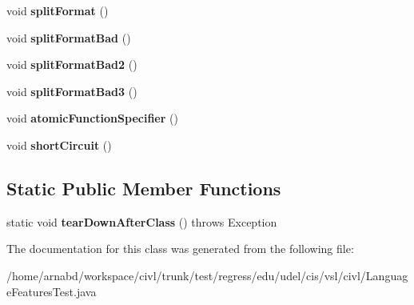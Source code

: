 \begin{DoxyCompactItemize}
\item 
\hypertarget{classedu_1_1udel_1_1cis_1_1vsl_1_1civl_1_1LanguageFeaturesTest_aa39345afbd31c5c1cd903d617ca5005e}{}void {\bfseries split\+Format} ()\label{classedu_1_1udel_1_1cis_1_1vsl_1_1civl_1_1LanguageFeaturesTest_aa39345afbd31c5c1cd903d617ca5005e}

\item 
\hypertarget{classedu_1_1udel_1_1cis_1_1vsl_1_1civl_1_1LanguageFeaturesTest_a744e50558f84c21ccb4fd24a23fc9f99}{}void {\bfseries split\+Format\+Bad} ()\label{classedu_1_1udel_1_1cis_1_1vsl_1_1civl_1_1LanguageFeaturesTest_a744e50558f84c21ccb4fd24a23fc9f99}

\item 
\hypertarget{classedu_1_1udel_1_1cis_1_1vsl_1_1civl_1_1LanguageFeaturesTest_a1360fd9cb99c59a0a1476f0ca05935f2}{}void {\bfseries split\+Format\+Bad2} ()\label{classedu_1_1udel_1_1cis_1_1vsl_1_1civl_1_1LanguageFeaturesTest_a1360fd9cb99c59a0a1476f0ca05935f2}

\item 
\hypertarget{classedu_1_1udel_1_1cis_1_1vsl_1_1civl_1_1LanguageFeaturesTest_a658fa96e541ae86c71da2629e2080bd8}{}void {\bfseries split\+Format\+Bad3} ()\label{classedu_1_1udel_1_1cis_1_1vsl_1_1civl_1_1LanguageFeaturesTest_a658fa96e541ae86c71da2629e2080bd8}

\item 
\hypertarget{classedu_1_1udel_1_1cis_1_1vsl_1_1civl_1_1LanguageFeaturesTest_a0ed54e55c9b241de25d6779ce35185c5}{}void {\bfseries atomic\+Function\+Specifier} ()\label{classedu_1_1udel_1_1cis_1_1vsl_1_1civl_1_1LanguageFeaturesTest_a0ed54e55c9b241de25d6779ce35185c5}

\item 
\hypertarget{classedu_1_1udel_1_1cis_1_1vsl_1_1civl_1_1LanguageFeaturesTest_a38bcb7788c7493ef31c81229ac219a0c}{}void {\bfseries short\+Circuit} ()\label{classedu_1_1udel_1_1cis_1_1vsl_1_1civl_1_1LanguageFeaturesTest_a38bcb7788c7493ef31c81229ac219a0c}

\end{DoxyCompactItemize}
\subsection*{Static Public Member Functions}
\begin{DoxyCompactItemize}
\item 
\hypertarget{classedu_1_1udel_1_1cis_1_1vsl_1_1civl_1_1LanguageFeaturesTest_a4bbacde19f125e933c284a8adabeb131}{}static void {\bfseries tear\+Down\+After\+Class} ()  throws Exception \label{classedu_1_1udel_1_1cis_1_1vsl_1_1civl_1_1LanguageFeaturesTest_a4bbacde19f125e933c284a8adabeb131}

\end{DoxyCompactItemize}


The documentation for this class was generated from the following file\+:\begin{DoxyCompactItemize}
\item 
/home/arnabd/workspace/civl/trunk/test/regress/edu/udel/cis/vsl/civl/Language\+Features\+Test.\+java\end{DoxyCompactItemize}

